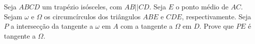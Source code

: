 Seja $ABCD$ um trapézio isósceles, com $ AB || CD $.  Seja $E$ o ponto médio de $AC$. Sejam $\omega$ e $\Omega$ os circumcírculos dos triângulos $ABE$ e $CDE$, respectivamente. Seja $P$ a intersecção da tangente a $\omega$ em $A$ com a tangente a $\Omega$ em $D$. Prove que $PE$ é tangente a $\Omega$.